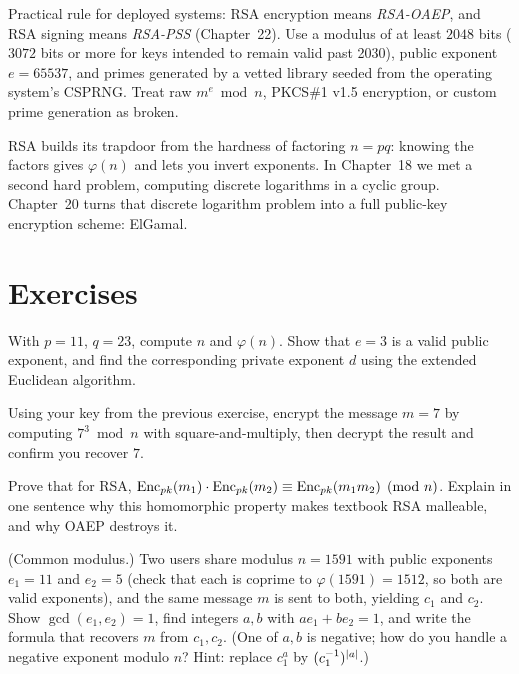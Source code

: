 \begin{focusbox}
Practical rule for deployed systems: RSA encryption means \emph{RSA-OAEP}, and RSA signing means \emph{RSA-PSS} (Chapter~22). Use a modulus of at least $2048$ bits ($3072$ bits or more for keys intended to remain valid past 2030), public exponent $e = 65537$, and primes generated by a vetted library seeded from the operating system's CSPRNG. Treat raw $m^e\bmod n$, PKCS\#1 v1.5 encryption, or custom prime generation as broken.
\end{focusbox}

\begin{connectionbox}
RSA builds its trapdoor from the hardness of factoring $n = pq$: knowing the factors gives $\varphi(n)$ and lets you invert exponents. In Chapter~18 we met a second hard problem, computing discrete logarithms in a cyclic group. Chapter~20 turns that discrete logarithm problem into a full public-key encryption scheme: ElGamal.
\end{connectionbox}

\section{Exercises}
\label{ch19:exercises}

\begin{exercise}
With $p=11$, $q=23$, compute $n$ and $\varphi(n)$. Show that $e=3$ is a valid public exponent, and find the corresponding private exponent $d$ using the extended Euclidean algorithm.
\end{exercise}

\begin{exercise}
Using your key from the previous exercise, encrypt the message $m=7$ by computing $7^{3}\bmod n$ with square-and-multiply, then decrypt the result and confirm you recover $7$.
\end{exercise}

\begin{exercise}
Prove that for RSA, $\operatorname{Enc}_{pk}(m_1)\cdot\operatorname{Enc}_{pk}(m_2)\equiv \operatorname{Enc}_{pk}(m_1 m_2)\pmod n$. Explain in one sentence why this homomorphic property makes textbook RSA malleable, and why OAEP destroys it.
\end{exercise}

\begin{exercise}
(Common modulus.) Two users share modulus $n=1591$ with public exponents $e_1=11$ and $e_2=5$ (check that each is coprime to $\varphi(1591)=1512$, so both are valid exponents), and the same message $m$ is sent to both, yielding $c_1$ and $c_2$. Show $\gcd(e_1,e_2)=1$, find integers $a,b$ with $a e_1+b e_2=1$, and write the formula that recovers $m$ from $c_1,c_2$. (One of $a,b$ is negative; how do you handle a negative exponent modulo $n$? Hint: replace $c_1^{a}$ by $(c_1^{-1})^{\lvert a\rvert}$.)
\end{exercise}

